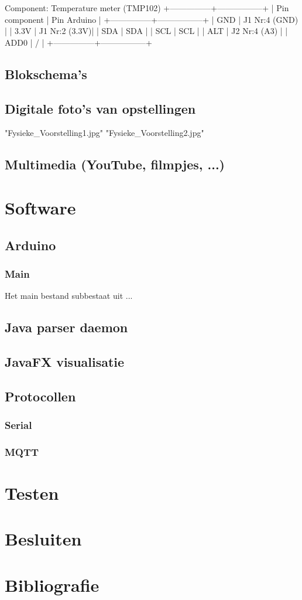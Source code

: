 \documentclass[a4paper]{report}
\begin{document}
Component: Temperature meter (TMP102)
+---------------+-----------------+
| Pin component |   Pin Arduino   |
+---------------+-----------------+
|      GND      | J1  Nr:4  (GND) |
|      3.3V     | J1  Nr:2  (3.3V)|
|      SDA      |       SDA       |
|      SCL      |       SCL       |
|      ALT      | J2  Nr:4  (A3)  |
|      ADD0     |        /        |
+---------------+-----------------+

\section{Blokschema’s}

\section{Digitale foto’s van opstellingen}
"Fysieke_Voorstelling1.jpg"
"Fysieke_Voorstelling2.jpg"

\section{Multimedia (YouTube, filmpjes, ...)}

\chapter{Software}
\section{Arduino}
\subsection{Main}
Het main bestand subbestaat uit ...

\section{Java parser daemon}

\section{JavaFX visualisatie}

\section{Protocollen}
\subsection{Serial}

\subsection{MQTT}

\chapter{Testen}

\chapter{Besluiten}

\chapter{Bibliografie}
\end{document}
